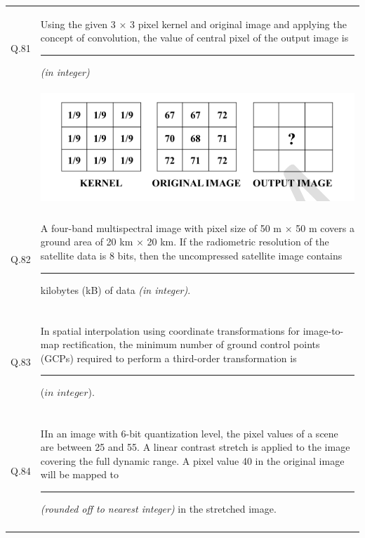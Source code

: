 \documentclass[12pt]{article}
\begin{document}
\begin{table}[H]
\renewcommand{\arraystretch}{3}
\setlength{\tabcolsep}{8pt}
\begin{tabular}{|l|p{15cm}|}
\hline
 & \\ \hline
Q.81& Using the given 3 × 3 pixel kernel and original image and applying the concept of
convolution, the value of central pixel of the output image is \rule{2cm}{0.15mm} \textit{(in integer)} \\ \hline
& \includegraphics[]{LatexImage13.png} \\ \hline
& \\ \hline
Q.82&A four-band multispectral image with pixel size of 50 m × 50 m covers a ground
area of 20 km × 20 km. If the radiometric resolution of the satellite data is 8 bits,
then the uncompressed satellite image contains\rule{2cm}{0.15mm}  kilobytes (kB) of data \textit{(in integer)}.\\ \hline

& \\ \hline
Q.83&In spatial interpolation using coordinate transformations for image-to-map
rectification, the minimum number of ground control points (GCPs) required to
perform a third-order transformation is \rule{2cm}{0.15mm}($in$ $integer$).\\ \hline
 & \\ \hline
 
Q.84&IIn an image with 6-bit quantization level, the pixel values of a scene are between 25
and 55. A linear contrast stretch is applied to the image covering the full dynamic
range. A pixel value 40 in the original image will be mapped to \rule{2cm}{0.15mm} \textit{(rounded off to nearest integer)} in the stretched image. \\ \hline
& \\ \hline


\end{tabular}
\end{table}
\end{document}
